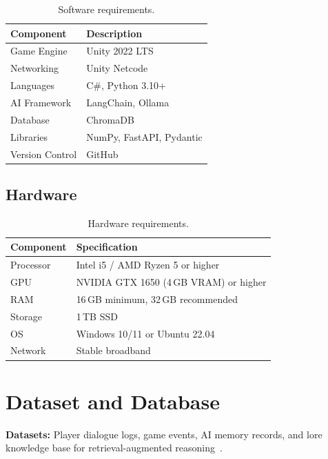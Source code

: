 \begin{table}[H]
\centering
\begin{tabular}{|l|p{8cm}|}
\hline
\textbf{Component} & \textbf{Description} \\ \hline
Game Engine        & Unity 2022 LTS \\ \hline
Networking         & Unity Netcode \\ \hline
Languages          & C\#, Python 3.10+ \\ \hline
AI Framework       & LangChain, Ollama \\ \hline
Database           & ChromaDB \\ \hline
Libraries          & NumPy, FastAPI, Pydantic \\ \hline
Version Control    & GitHub \\ \hline
\end{tabular}
\caption{Software requirements.}
\label{tab:software}
\end{table}

\subsection{Hardware}

\begin{table}[H]
\centering
\begin{tabular}{|l|p{8cm}|}
\hline
\textbf{Component} & \textbf{Specification} \\ \hline
Processor  & Intel i5 / AMD Ryzen 5 or higher \\ \hline
GPU        & NVIDIA GTX 1650 (4\,GB VRAM) or higher \\ \hline
RAM        & 16\,GB minimum, 32\,GB recommended \\ \hline
Storage    & 1\,TB SSD \\ \hline
OS         & Windows 10/11 or Ubuntu 22.04 \\ \hline
Network    & Stable broadband \\ \hline
\end{tabular}
\caption{Hardware requirements.}
\label{tab:hardware}
\end{table}

\section{Dataset and Database}

\textbf{Datasets:} Player dialogue logs, game events, AI memory records, and lore knowledge base for retrieval-augmented reasoning~\cite{hagendorff2023,danry2023,park2023ai}.

